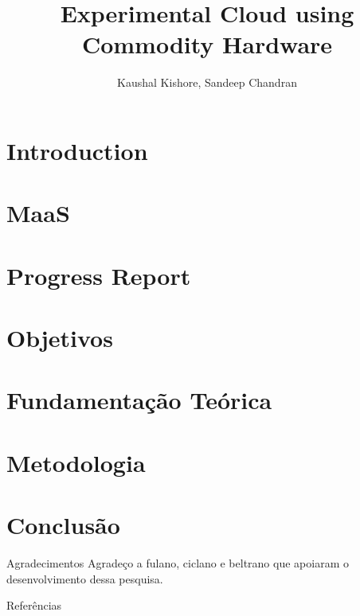 \documentclass[aspectratio=169,11pt]{beamer}
\title[Interim Report]{Experimental Cloud using Commodity Hardware}
\author[111601008]{Kaushal Kishore, Sandeep Chandran}
\begin{document}


\section{Introduction} 


\section{MaaS}


\section{Progress Report}


\section{}


\section{Objetivos}


\section{Fundamentação Teórica}


\section{Metodologia}


% 

\section{Conclusão}


\begin{frame}{Agradecimentos}
    \large{Agradeço a fulano, ciclano e beltrano que apoiaram o desenvolvimento dessa pesquisa.}
\end{frame}


\nocite{*}
\begin{frame}[allowframebreaks]{Referências}


\end{frame}


\begin{frame}
\titlepage 
\end{frame}
\end{document}
